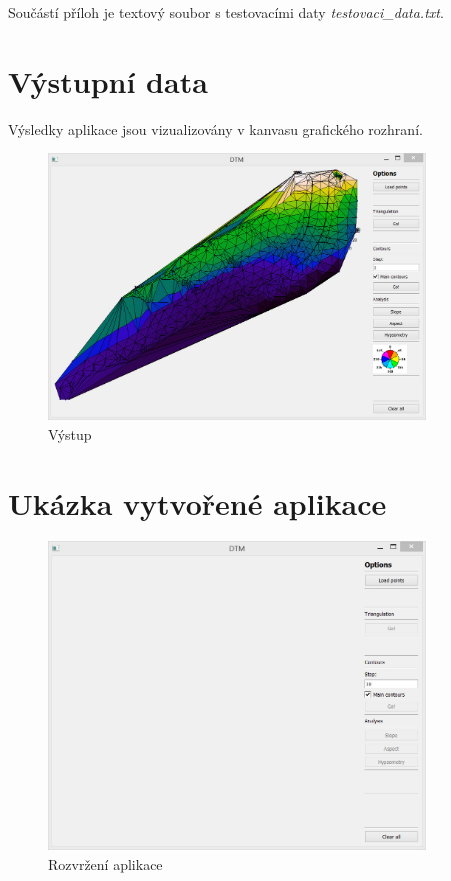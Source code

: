 \documentclass[a4paper, 12pt]{article}
\begin{document}
\noindent Součástí příloh je textový soubor s testovacími daty \textit{testovaci\_data.txt}.

\vspace{4.5cm}

\section{Výstupní data}
Výsledky aplikace jsou vizualizovány v kanvasu grafického rozhraní.

\begin{figure}[h]
	\centering
	\includegraphics[width=10cm]{hypsometrie.jpg}
	\caption{Výstup}
\end{figure}

\clearpage

\section{Ukázka vytvořené aplikace}


\begin{figure}[h]
	\centering
	\includegraphics[width=10cm]{aplikace.jpg}
	\caption{Rozvržení aplikace}
\end{figure}
\end{document}
